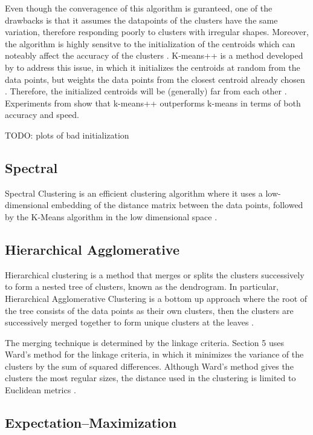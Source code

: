 \documentclass[12pt,english]{article}
\begin{document}
Even though the converagence of this algorithm is guranteed, one of the drawbacks is that it assumes the datapoints of the clusters have the same variation, therefore responding poorly to clusters with irregular shapes. Moreover, the algorithm is highly sensitve to the initialization of the centroids which can noteably affect the accuracy of the clusters \cite{scikit-learn}. K-means++ is a method developed by \cite{kmeans} to address this issue, in which it initializes the centroids at random from the data points, but weights the data points from the closest centroid already chosen \cite{kmeans}. Therefore, the initialized centroids will be (generally) far from each other \cite{scikit-learn}. Experiments from \cite{kmeans} show that k-means++ outperforms k-means in terms of both accuracy and speed.

TODO: plots of bad initialization

\subsection{Spectral}

\quad
Spectral Clustering is an efficient clustering algorithm where it uses a low-dimensional embedding of the distance matrix between the data points, followed by the K-Means algorithm in the low dimensional space \cite{scikit-learn}.

\subsection{Hierarchical Agglomerative}

\quad
Hierarchical clustering is a method that merges or splits the clusters successively to form a nested tree of clusters, known as the dendrogram. In particular, Hierarchical Agglomerative Clustering is a bottom up approach where the root of the tree consists of the data points as their own clusters, then the clusters are successively merged together to form unique clusters at the leaves \cite{scikit-learn}.

The merging technique is determined by the linkage criteria. Section 5 uses Ward's method for the linkage criteria, in which it minimizes the variance of the clusters by the sum of squared differences. Although Ward's method gives the clusters the most regular sizes, the distance used in the clustering is limited to Euclidean metrics \cite{scikit-learn}.

\subsection{Expectation–Maximization}
\end{document}

